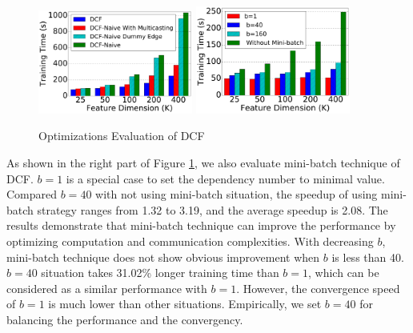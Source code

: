 \documentclass{llncs}
\begin{document}
\begin{figure}[!t]
\centering
\includegraphics[width=2in]{pics/opt.pdf}
\includegraphics[width=2in]{pics/mb.pdf}
\vspace{-10pt}
\caption{Optimizations Evaluation of DCF}
\label{fig:opt}
\end{figure}


As shown in the right part of Figure \ref{fig:opt}, we also evaluate mini-batch technique of DCF. $b = 1$ is a special case to set the dependency number to minimal value. Compared $b=40$ with not using mini-batch situation, the speedup of using mini-batch strategy ranges from 1.32 to 3.19, and the average speedup is 2.08. The results demonstrate that mini-batch technique can improve the performance by optimizing computation and communication complexities. With decreasing $b$, mini-batch technique does not show obvious improvement when $b$ is less than 40. $b=40$ situation takes 31.02\% longer training time than $b=1$, which can be considered as a similar performance with $b=1$. However, the convergence speed of $b=1$ is much lower than other situations. Empirically, we set $b=40$ for balancing the performance and the convergency.
\end{document}
